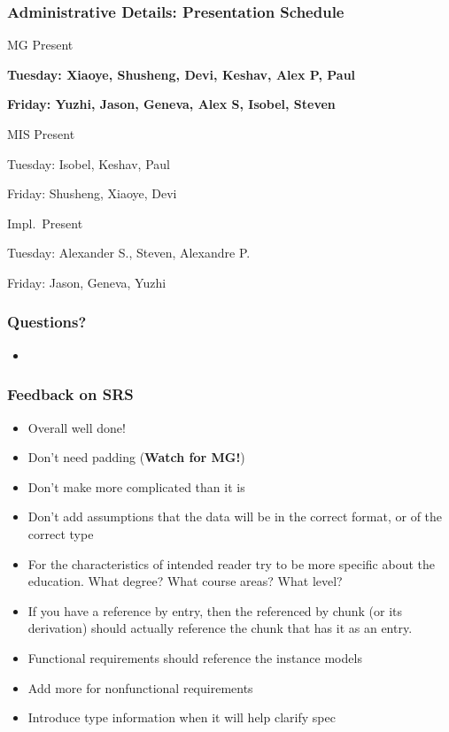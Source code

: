 \documentclass[t,12pt,numbers,fleqn]{beamer}
\begin{document}

\begin{frame}
\frametitle{Administrative Details: Presentation Schedule}

\bi
\item MG Present
\bi
\item \textbf{Tuesday: Xiaoye, Shusheng, Devi, Keshav, Alex P, Paul}
\item \textbf{Friday: Yuzhi, Jason, Geneva, Alex S, Isobel, Steven}
\ei
\item MIS Present
\bi
\item Tuesday: Isobel, Keshav, Paul
\item Friday: Shusheng, Xiaoye, Devi
\ei
\item Impl.\ Present
\bi
\item Tuesday: Alexander S., Steven, Alexandre P.
\item Friday: Jason, Geneva, Yuzhi
\ei

\ei

\end{frame}


\begin{frame}
\frametitle{Questions?}
\begin{itemize}
\item {}
\end{itemize}
\end{frame}


\begin{frame}
\frametitle{Feedback on SRS}
\begin{itemize}
\item Overall well done!
\item Don't need padding (\textbf{Watch for MG!})
\bi
\item Don't make more complicated than it is
\item Don't add assumptions that the data will be in the correct format, or of
  the correct type 
\ei
\item For the characteristics of intended reader try to be more specific about
  the education.  What degree?  What course areas?  What level?
\item If you have a reference by entry, then the referenced by chunk (or its
  derivation) should actually reference the chunk that has it as an entry.
\item Functional requirements should reference the instance models
\item Add more for nonfunctional requirements
\item Introduce type information when it will help clarify spec
\end{itemize}
\end{frame}
\end{document}
